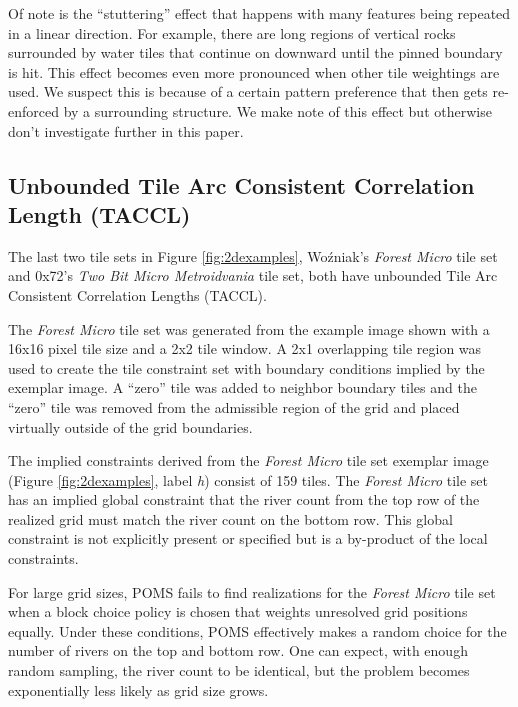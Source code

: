 Of note is the ``stuttering'' effect that happens with many features being repeated in a linear direction.
For example, there are long regions of vertical rocks surrounded by water tiles that continue on downward until the
pinned boundary is hit.
This effect becomes even more pronounced when other tile weightings are used.
We suspect this is because of a certain pattern preference that then gets re-enforced
by a surrounding structure.
We make note of this effect but otherwise don't investigate further in this paper.

\subsection{Unbounded Tile Arc Consistent Correlation Length (TACCL)}

The last two tile sets in Figure \ref{fig:2dexamples}, Wo\'zniak's \textit{Forest Micro} tile set and 0x72's \textit{Two Bit Micro Metroidvania} tile set,
both have unbounded Tile Arc Consistent Correlation Lengths (TACCL).

The \textit{Forest Micro} tile set was generated from the example image shown with a 16x16 pixel tile size and a 2x2 tile window.
A 2x1 overlapping tile region was used to create the tile constraint set with boundary conditions implied by the exemplar image.
A ``zero'' tile was added to neighbor boundary tiles and the ``zero'' tile was removed from
the admissible region of the grid and placed virtually outside of the grid boundaries.

The implied constraints derived from the \textit{Forest Micro} tile set exemplar image (Figure \ref{fig:2dexamples}, label \textit{h}) consist of 159 tiles.
The \textit{Forest Micro} tile set has an implied global constraint that the river count from the top row of the realized
grid must match the river count on the bottom row.
This global constraint is not explicitly present or specified but is a by-product of the local constraints.

For large grid sizes, POMS fails to find realizations for the \textit{Forest Micro} tile set when a block
choice policy is chosen that weights unresolved grid positions equally.
Under these conditions, POMS effectively makes a random choice for the number of rivers on the top and bottom row.
One can expect, with enough random sampling, the river count to be identical, but the problem
becomes exponentially less likely as grid size grows.

